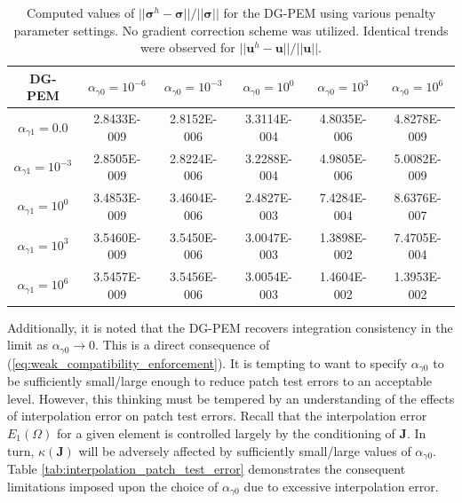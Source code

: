 \begin{table}[!ht]
  \begin{center}
    \begin{tabular}{| c || c | c | c | c | c |}
    \hline
    DG-PEM & $\alpha_{\gamma0} = 10^{-6}$ & $\alpha_{\gamma0} = 10^{-3}$ & $\alpha_{\gamma0} = 10^{0}$ & $\alpha_{\gamma0} = 10^{3}$ & $\alpha_{\gamma0} = 10^{6}$ \\ \hline \hline
    	$\alpha_{\gamma1} = 0.0$ & 2.8433E-009 & 2.8152E-006 & 3.3114E-004 & 4.8035E-006 & 4.8278E-009 \\ \hline
    $\alpha_{\gamma1} = 10^{-3}$ & 2.8505E-009 & 2.8224E-006 & 3.2288E-004 & 4.9805E-006 & 5.0082E-009 \\ \hline
    $\alpha_{\gamma1} = 10^{0}$ & 3.4853E-009 & 3.4604E-006 & 2.4827E-003 &  7.4284E-004 & 8.6376E-007 \\ \hline
    $\alpha_{\gamma1} = 10^{3}$ & 3.5460E-009 & 3.5450E-006 & 3.0047E-003 & 1.3898E-002 & 7.4705E-004 \\ \hline
    $\alpha_{\gamma1} = 10^{6}$ & 3.5457E-009 & 3.5456E-006 & 3.0054E-003 & 1.4604E-002 & 1.3953E-002 \\
    \hline
    \end{tabular}
    \caption{Computed values of $||\boldsymbol{\sigma}^h - \boldsymbol{\sigma}|| / ||\boldsymbol{\sigma}||$ for the DG-PEM using various penalty parameter settings. No gradient correction scheme was utilized. Identical trends were observed for $||\mathbf{u}^h - \mathbf{u}|| / ||\mathbf{u}||$.}
    \vspace{-5pt}
    \label{tab:linear_patch_test_parameter_study}
    \vspace{-10pt}
  \end{center}
\end{table}

Additionally, it is noted that the DG-PEM recovers integration consistency in the limit as $\alpha_{\gamma0} \rightarrow 0$. This is a direct consequence of (\ref{eq:weak_compatibility_enforcement}). It is tempting to want to specify $\alpha_{\gamma0}$ to be sufficiently small/large enough to reduce patch test errors to an acceptable level. However, this thinking must be tempered by an understanding of the effects of interpolation error on patch test errors. Recall that the interpolation error $E_1 (\Omega)$ for a given element is controlled largely by the conditioning of $\mathbf{J}$. In turn, $\kappa (\mathbf{J})$ will be adversely affected by sufficiently small/large values of $\alpha_{\gamma0}$. Table \ref{tab:interpolation_patch_test_error} demonstrates the consequent limitations imposed upon the choice of $\alpha_{\gamma0}$ due to excessive interpolation error.

